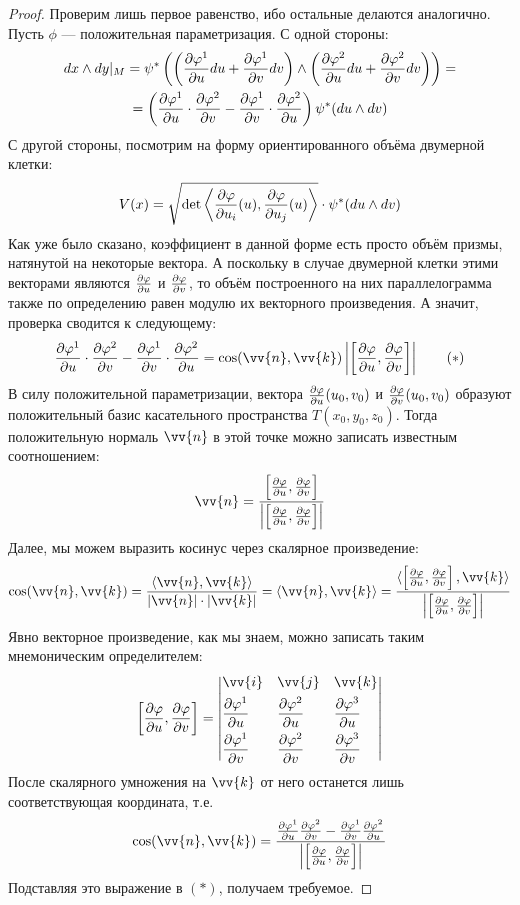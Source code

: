 \begin{proof}
	Проверим лишь первое равенство, ибо остальные делаются аналогично. Пусть $\phi$ --- положительная параметризация. С одной стороны:
	\begin{multline*}
		dx \wedge dy|_M = \psi^* \left(\left(\frac{\partial \varphi^1}{\partial u}du + \frac{\partial \varphi^1}{\partial v}dv\right) \wedge \left(\frac{\partial \varphi^2}{\partial u}du + \frac{\partial \varphi^2}{\partial v}dv\right)\right) = \\
		= \left(\frac{\partial \varphi^1}{\partial u} \cdot \frac{\partial \varphi^2}{\partial v} - \frac{\partial \varphi^1}{\partial v} \cdot \frac{\partial \varphi^2}{\partial u}\right) \psi^* (du \wedge dv)
	\end{multline*}
	С другой стороны, посмотрим на форму ориентированного объёма двумерной клетки:
	\[
		V(x) = \sqrt{\det\left\langle\frac{\partial \varphi}{\partial u_i}(u), 	\frac{\partial \varphi}{\partial u_j}(u)\right\rangle} \cdot \psi^*(du \wedge dv)
	\]
	Как уже было сказано, коэффициент в данной форме есть просто объём призмы, натянутой на некоторые вектора. А поскольку в случае двумерной клетки этими векторами являются $\frac{\partial \varphi}{\partial u}$ и $\frac{\partial \varphi}{\partial v}$, то объём построенного на них параллелограмма также по определению равен модулю их векторного произведения. А значит, проверка сводится к следующему:
	\[
		\pd{\phi^1}{u} \cdot \pd{\phi^2}{v} - \pd{\phi^1}{v} \cdot \pd{\phi^2}{u} = \cos(\vv{n}, \vv{k}) \md{\sbr{\pd{\phi}{u}, \pd{\phi}{v}}} \tag{$\ast$}
	\]
	В силу положительной параметризации, вектора $\frac{\partial \varphi}{\partial u}(u_0, v_0)$ и $\frac{\partial \varphi}{\partial v}(u_0, v_0)$ образуют положительный базис касательного пространства $T(x_0, y_0, z_0)$. Тогда положительную нормаль $\vv{n}$ в этой точке можно записать известным соотношением:
	\[
		\vv{n} = \frac{\sbr{\pd{\phi}{u}, 	\pd{\phi}{v}}}{\md{\sbr{\pd{\phi}{u}, \pd{\phi}{v}}}}
	\]
	Далее, мы можем выразить косинус через скалярное произведение:
	\[
		\cos(\vv{n}, \vv{k}) = \frac{\ntbr{\vv{n}, \vv{k}}}{\md{\vv{n}} \cdot |\vv{k}|} = \ntbr{\vv{n}, \vv{k}} = \frac{\ntbr{\sbr{\pd{\phi}{u}, \pd{\phi}{v}}, \vv{k}}}{\md{\sbr{\pd{\phi}{u}, \pd{\phi}{v}}}}
	\]
	Явно векторное произведение, как мы знаем, можно записать таким мнемоническим определителем:
	\[
	\sbr{\pd{\phi}{u}, \pd{\phi}{v}} = \Det{
		&\vv{i}& &\vv{j}& &\vv{k}
		\\
		&\pd{\phi^1}{u}& &\pd{\phi^2}{u}& &\pd{\phi^3}{u}
		\\
		&\pd{\phi^1}{v}& &\pd{\phi^2}{v}& &\pd{\phi^3}{v}
	}
	\]
	После скалярного умножения на $\vv{k}$ от него останется лишь соответствующая координата, т.е.
	\[
		\cos(\vv{n}, \vv{k}) = \frac{\pd{\phi^1}{u} \pd{\phi^2}{v} - \pd{\phi^1}{v} \pd{\phi^2}{u}}{\md{\sbr{\pd{\phi}{u}, \pd{\phi}{v}}}}
	\]
	Подставляя это выражение в $(*)$, получаем требуемое.
\end{proof}

